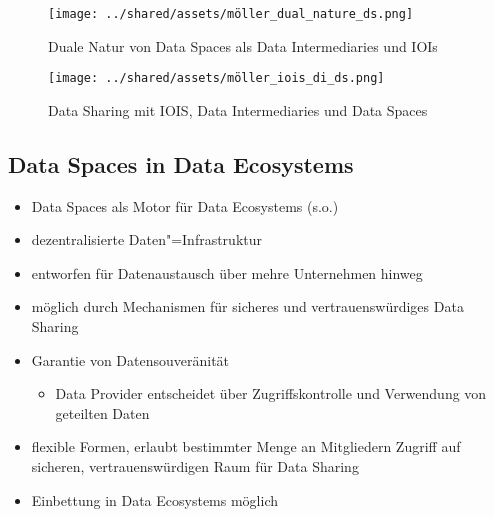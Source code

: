 \begin{figure}
    \texttt{[image: ../shared/assets/möller\_dual\_nature\_ds.png]}
    \caption{Duale Natur von Data Spaces als Data Intermediaries und IOIs~\cite{mollerIndustrialDataEcosystems2024}}
    \label{fig:dual-nature-ds}
\end{figure}

\begin{figure}
    \texttt{[image: ../shared/assets/möller\_iois\_di\_ds.png]}
    \caption{Data Sharing mit IOIS, Data Intermediaries und Data Spaces~\cite{mollerIndustrialDataEcosystems2024}}
\end{figure}


\subsection{Data Spaces in Data Ecosystems}

\begin{itemize}
    \item Data Spaces als Motor für Data Ecosystems (s.o.)
    \item dezentralisierte Daten"=Infrastruktur
    \item entworfen für Datenaustausch über mehre Unternehmen hinweg
    \item möglich durch Mechanismen für sicheres und vertrauenswürdiges Data Sharing
    \item Garantie von Datensouveränität
    \begin{itemize}
        \item Data Provider entscheidet über Zugriffskontrolle und Verwendung von geteilten Daten
    \end{itemize}
    \item flexible Formen, erlaubt bestimmter Menge an Mitgliedern Zugriff auf sicheren, vertrauenswürdigen Raum für Data Sharing
    \item Einbettung in Data Ecosystems möglich~\cite{mollerIndustrialDataEcosystems2024}
\end{itemize}

\vspace{1cm}

